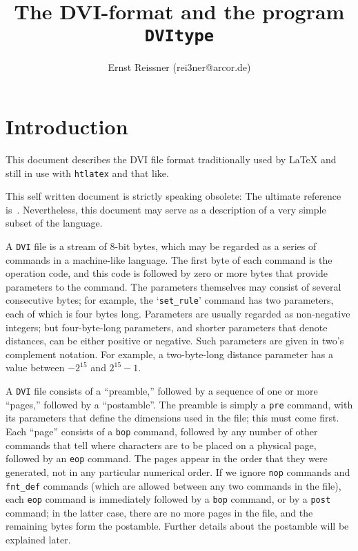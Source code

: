 \documentclass[10pt, a4paper]{article}
\title{The DVI-format and the program \texttt{DVItype}}
\author{Ernst Reissner (rei3ner@arcor.de)}
\date{}
\begin{document}
\maketitle
\tableofcontents

\section{Introduction}
This document describes the DVI file format 
traditionally used by \LaTeX{} 
and still in use with \texttt{htlatex} and that like. 

This self written document is strictly speaking obsolete: 
The ultimate reference is~\cite{DviType}. 
Nevertheless, this document may serve as a description of a very simple subset of the language. 

A \texttt{DVI} file is a stream of 8-bit bytes, which may be regarded as a
series of commands in a machine-like language. The first byte of each command
is the operation code, and this code is followed by zero or more bytes
that provide parameters to the command. The parameters themselves may consist
of several consecutive bytes; 
for example, the `\texttt{set\_rule}' command has two
parameters, each of which is four bytes long. Parameters are usually
regarded as non-negative integers; but four-byte-long parameters,
and shorter parameters that denote distances, can be
either positive or negative. Such parameters are given in two's complement
notation. For example, a two-byte-long distance parameter has a value between
$-2^{15}$ and $2^{15}-1$.


A \texttt{DVI} file consists of a ``preamble,'' 
followed by a sequence of one or more ``pages,'' 
followed by a ``postamble''. 
The preamble is simply a \texttt{pre} command, 
with its parameters that define the dimensions used in the file; 
this must come first.  
Each ``page'' consists of a \texttt{bop} command,
followed by any number of other commands that tell where characters are to
be placed on a physical page, followed by an \texttt{eop} command. 
The pages appear in the order that they were generated, 
not in any particular numerical order. 
If we ignore \texttt{nop} commands and \texttt{fnt\_def} commands
(which are allowed between any two commands in the file), 
each \texttt{eop} command is immediately followed by a \texttt{bop} command, 
or by a \texttt{post} command; 
in the latter case, there are no more pages in the file, 
and the remaining bytes form the postamble.  
Further details about the postamble will be explained later.
\end{document}
